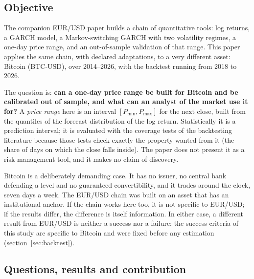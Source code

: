 \documentclass[12pt,a4paper]{article}
\begin{document}
\subsection{Objective}

The companion EUR/USD paper \citep{ZEWU2026fx} builds a chain of quantitative tools: log returns, a GARCH model, a Markov-switching GARCH with two volatility regimes, a one-day price range, and an out-of-sample validation of that range. This paper applies the same chain, with declared adaptations, to a very different asset: Bitcoin (BTC-USD), over 2014--2026, with the backtest running from 2018 to 2026.

The question is: \textbf{can a one-day price range be built for Bitcoin and be calibrated out of sample, and what can an analyst of the market use it for?} A \emph{price range} here is an interval $[P_{\min}, P_{\max}]$ for the next close, built from the quantiles of the forecast distribution of the log return. Statistically it is a prediction interval; it is evaluated with the coverage tests of the backtesting literature \citep{kupiec1995,christoffersen1998} because those tests check exactly the property wanted from it (the share of days on which the close falls inside). The paper does not present it as a risk-management tool, and it makes no claim of discovery.

Bitcoin is a deliberately demanding case. It has no issuer, no central bank defending a level and no guaranteed convertibility, and it trades around the clock, seven days a week. The EUR/USD chain was built on an asset that has an institutional anchor. If the chain works here too, it is not specific to EUR/USD; if the results differ, the difference is itself information. In either case, a different result from EUR/USD is neither a success nor a failure: the success criteria of this study are specific to Bitcoin and were fixed before any estimation (section~\ref{sec:backtest}).

\subsection{Questions, results and contribution}
\end{document}
